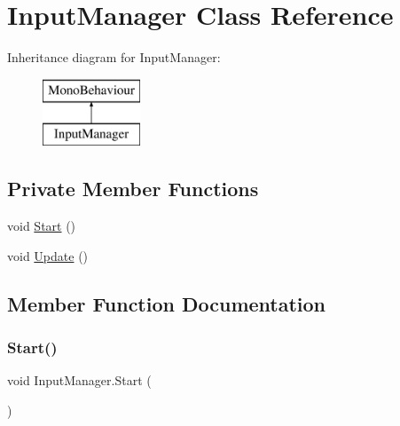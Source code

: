 \hypertarget{class_input_manager}{}\section{Input\+Manager Class Reference}
\label{class_input_manager}
Inheritance diagram for Input\+Manager\+:\begin{figure}[H]
\begin{center}
\leavevmode
\includegraphics[height=2.000000cm]{class_input_manager}
\end{center}
\end{figure}
\subsection*{Private Member Functions}
\begin{DoxyCompactItemize}
\item 
void \hyperlink{class_input_manager_a5ea91a2053e03c49da58ee3a56628763}{Start} ()
\item 
void \hyperlink{class_input_manager_a17a33be75084fed42bebb52892323c62}{Update} ()
\end{DoxyCompactItemize}


\subsection{Member Function Documentation}
\mbox{\label{class_input_manager_a5ea91a2053e03c49da58ee3a56628763}} 
\subsubsection{\texorpdfstring{Start()}{Start()}}
{\footnotesize\ttfamily void Input\+Manager.\+Start (\begin{DoxyParamCaption}{ }\end{DoxyParamCaption})\hspace{0.3cm}{\ttfamily [private]}}

\mbox{\label{class_input_manager_a17a33be75084fed42bebb52892323c62}} 
